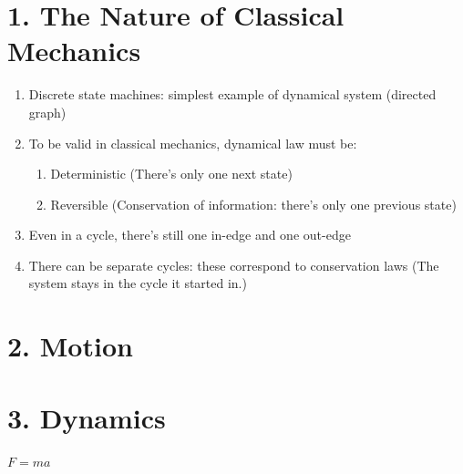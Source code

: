 \section{1. The Nature of  Classical Mechanics}
\begin{enumerate}
\item Discrete state machines: simplest example of dynamical system (directed graph)
\item To be valid in classical mechanics, dynamical law must be:
  \begin{enumerate}
  \item Deterministic (There's only one next state)
  \item Reversible (Conservation of information: there's only one previous state)
  \end{enumerate}
\item Even in a cycle, there's still one in-edge and one out-edge
\item There can be separate cycles: these correspond to conservation laws (The system stays in the cycle it started in.)
\end{enumerate}

\section{2. Motion}

\section{3. Dynamics}
$F = ma$

